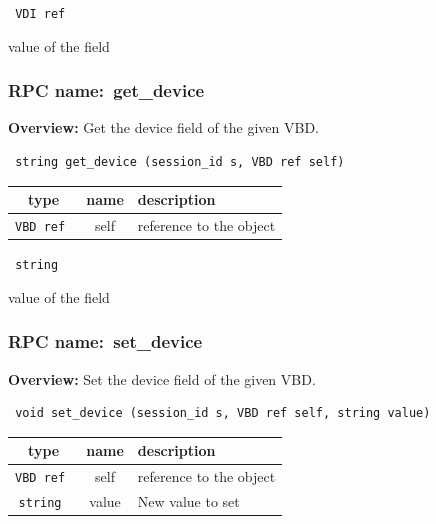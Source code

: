 \vspace{0.3cm}

{\tt 
VDI ref
}


value of the field
\vspace{0.3cm}
\vspace{0.3cm}
\vspace{0.3cm}
\subsubsection{RPC name:~get\_device}

{\bf Overview:} 
Get the device field of the given VBD.

\begin{verbatim} string get_device (session_id s, VBD ref self)\end{verbatim}



 
\vspace{0.3cm}
\begin{tabular}{|c|c|p{7cm}|}
 \hline
{\bf type} & {\bf name} & {\bf description} \\ \hline
{\tt VBD ref } & self & reference to the object \\ \hline 

\end{tabular}

\vspace{0.3cm}

{\tt 
string
}


value of the field
\vspace{0.3cm}
\vspace{0.3cm}
\vspace{0.3cm}
\subsubsection{RPC name:~set\_device}

{\bf Overview:} 
Set the device field of the given VBD.

\begin{verbatim} void set_device (session_id s, VBD ref self, string value)\end{verbatim}



 
\vspace{0.3cm}
\begin{tabular}{|c|c|p{7cm}|}
 \hline
{\bf type} & {\bf name} & {\bf description} \\ \hline
{\tt VBD ref } & self & reference to the object \\ \hline 

{\tt string } & value & New value to set \\ \hline 

\end{tabular}

